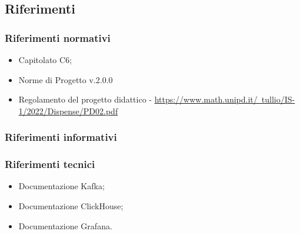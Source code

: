 \subsection{Riferimenti}
\subsubsection{Riferimenti normativi}
\begin{itemize}
    \item Capitolato C6;
    \item Norme di Progetto v.2.0.0
    \item  Regolamento del progetto didattico - \href{https://www.math.unipd.it/~tullio/IS-1/2022/Dispense/PD02.pdf}{https://www.math.unipd.it/~tullio/IS-1/2022/Dispense/PD02.pdf}
\end{itemize}
\subsubsection{Riferimenti informativi}
\subsubsection{Riferimenti tecnici}
\begin{itemize}
    \item Documentazione Kafka;
    \item Documentazione ClickHouse;
    \item Documentazione Grafana.
\end{itemize}
